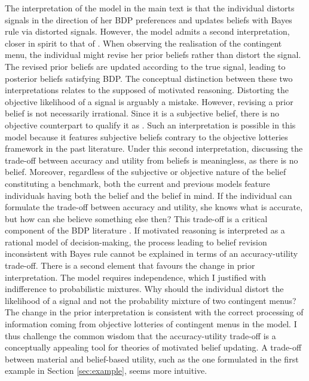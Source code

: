 The interpretation of the model in the main text is that the individual distorts signals in the direction of her BDP preferences and updates beliefs with Bayes rule via distorted signals. However, the model admits a second interpretation, closer in spirit to that of \cite{epsteinAxiomaticModelNonBayesian2006}. When observing the realisation of the contingent menu, the individual might revise her prior beliefs rather than distort the signal. The revised prior beliefs are updated according to the true signal, leading to posterior beliefs satisfying BDP. The conceptual distinction between these two interpretations relates to the supposed  of motivated reasoning. Distorting the objective likelihood of a signal is arguably a mistake. However, revising a prior belief is not necessarily irrational. Since it is a subjective belief, there is no objective counterpart to qualify it as . Such an interpretation is possible in this model because it features subjective beliefs contrary to the objective lotteries framework in the past literature. Under this second interpretation, discussing the trade-off between accuracy and utility from beliefs is meaningless, as there is no  belief. Moreover, regardless of the subjective or objective nature of the belief constituting a benchmark, both the current and previous models feature individuals having both the  belief and the  belief in mind. If the individual can formulate the trade-off between accuracy and utility, she knows what is accurate, but how can she believe something else then? This trade-off is a critical component of the BDP literature \citep{benabou2016mindful}. If motivated reasoning is interpreted as a rational model of decision-making, the process leading to belief revision inconsistent with Bayes rule cannot be explained in terms of an accuracy-utility trade-off. There is a second element that favours the change in prior interpretation. The model requires independence, which I justified with indifference to probabilistic mixtures. Why should the individual distort the likelihood of a signal and not the probability mixture of two contingent menus? The change in the prior interpretation is consistent with the correct processing of information coming from objective lotteries of contingent menus in the model. I thus challenge the common wisdom that the accuracy-utility trade-off is a conceptually appealing tool for theories of motivated belief updating. A trade-off between material and belief-based utility, such as the one formulated in the first example in Section \ref{sec:example}, seems more intuitive.

